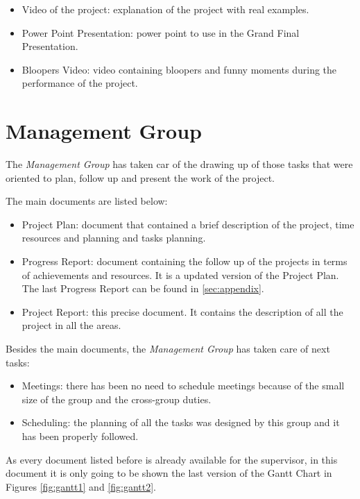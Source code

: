 \documentclass[11pt,a4paper,english]{book}  %
\theoremstyle{definition}  %
\theoremstyle{plain}  %
\theoremstyle{remark}  %
\begin{document}
\begin{itemize}
\item Video of the project: explanation of the project with real examples.
\item Power Point Presentation: power point to use in the Grand Final Presentation.
\item Bloopers Video: video containing bloopers and funny moments during the performance of the project.
\end{itemize}

	\section{Management Group}

The \textit{Management Group} has taken car of the drawing up of those tasks that were oriented to plan, follow up and present the work of the project.

The main documents are listed below:

\begin{itemize}
\item Project Plan: document that contained a brief description of the project, time resources and planning and tasks planning.
\item Progress Report: document containing the follow up of the projects in terms of achievements and resources. It is a updated version of the Project Plan. The last Progress Report can be found in \ref{sec:appendix}.
\item Project Report: this precise document. It contains the description of all the project in all the areas.
\end{itemize}

Besides the main documents, the \textit{Management Group} has taken care of next tasks:

\begin{itemize}
\item Meetings: there has been no need to schedule meetings because of the small size of the group and the cross-group duties.
\item  Scheduling: the planning of all the tasks was designed by this group and it has been properly followed.
\end{itemize}

As every document listed before is already available for the supervisor, in this document it is only going to be shown the last version of the Gantt Chart in Figures \ref{fig:gantt1} and \ref{fig:gantt2}.
\end{document}
